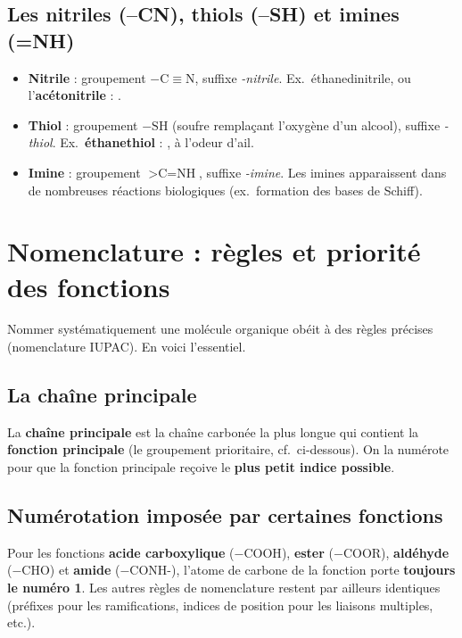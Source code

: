 \documentclass[11pt,a4paper]{article}
\begin{document}
\subsection{Les nitriles (--CN), thiols (--SH) et imines (=NH)}
\begin{definition}
\hfill
\begin{itemize}[leftmargin=1.6em,itemsep=1pt]
  \item \textbf{Nitrile} : groupement $-\text{C}\equiv\text{N}$, suffixe \textit{-nitrile}. Ex.\ éthanedinitrile, ou l'\textbf{acétonitrile}  : .
  \item \textbf{Thiol} : groupement $-\text{SH}$ (soufre remplaçant l'oxygène d'un alcool), suffixe \textit{-thiol}. Ex.\ \textbf{éthanethiol}  : , à l'odeur d'ail.
  \item \textbf{Imine} : groupement $>\text{C=NH}$, suffixe \textit{-imine}. Les imines apparaissent dans de nombreuses réactions biologiques (ex.\ formation des bases de Schiff).
\end{itemize}
\end{definition}

\section{Nomenclature : règles et priorité des fonctions}
Nommer systématiquement une molécule organique obéit à des règles précises (nomenclature IUPAC). En voici l'essentiel.

\subsection{La chaîne principale}
\begin{regle}
La \textbf{chaîne principale} est la chaîne carbonée la plus longue qui contient la \textbf{fonction principale} (le groupement prioritaire, cf.\ ci-dessous). On la numérote pour que la fonction principale reçoive le \textbf{plus petit indice possible}.
\end{regle}

\subsection{Numérotation imposée par certaines fonctions}
\begin{regle}
Pour les fonctions \textbf{acide carboxylique} ($-\text{COOH}$), \textbf{ester} ($-\text{COOR}$), \textbf{aldéhyde} ($-\text{CHO}$) et \textbf{amide} ($-\text{CONH-}$), l'atome de carbone de la fonction porte \textbf{toujours le numéro 1}. Les autres règles de nomenclature restent par ailleurs identiques (préfixes pour les ramifications, indices de position pour les liaisons multiples, etc.).
\end{regle}
\end{document}
